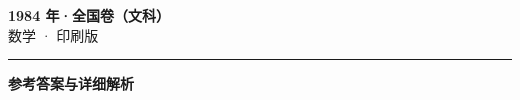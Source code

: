 \documentclass[zihao=5, a4paper]{ctexart}
\begin{document}
\begin{center}
  {\Large\bfseries 1984 年·全国卷（文科）}\\[4pt]
  {\large 数学 · 印刷版}
\end{center}
\medskip
{}

\par\bigskip\hrule\bigskip
{}
\begin{center}{\large\bfseries 参考答案与详细解析}\end{center}
\smallskip

\end{document}
